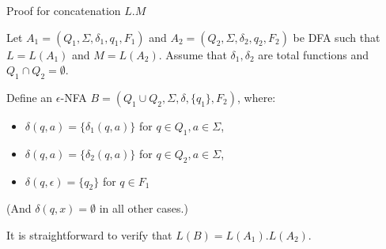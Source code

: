 \documentclass[handout]{beamer}
\begin{document}
\begin{frame}{Proof for concatenation $L.M$}

    Let $A_1=(Q_1,\Sigma, \delta_1,q_1,F_1)$ and $A_2=(Q_2,\Sigma, \delta_2,q_2,F_2)$ be DFA such that $L=L(A_1)$ and $M=L(A_2)$. Assume that $\delta_1,\delta_2$ are total functions and $Q_1\cap Q_2=\emptyset$.
    
    Define an $\epsilon$-NFA $B=(Q_1\cup Q_2,\Sigma,\delta,\{q_1\},F_2)$, where:
    \begin{itemize}
        \item $\delta(q,a)=\{\delta_1(q,a)\}$ for $q\in Q_1,a\in\Sigma$,
        \item $\delta(q,a)=\{\delta_2(q,a)\}$ for $q\in Q_2,a\in\Sigma$,
        \item $\delta(q,\epsilon)=\{q_2\}$ for $q\in F_1$
    \end{itemize}
    (And $\delta(q,x)=\emptyset$ in all other cases.)
    
    It is straightforward to verify that $L(B)=L(A_1).L(A_2)$.\hfill\qedsymbol

    

\end{frame}
\end{document}
